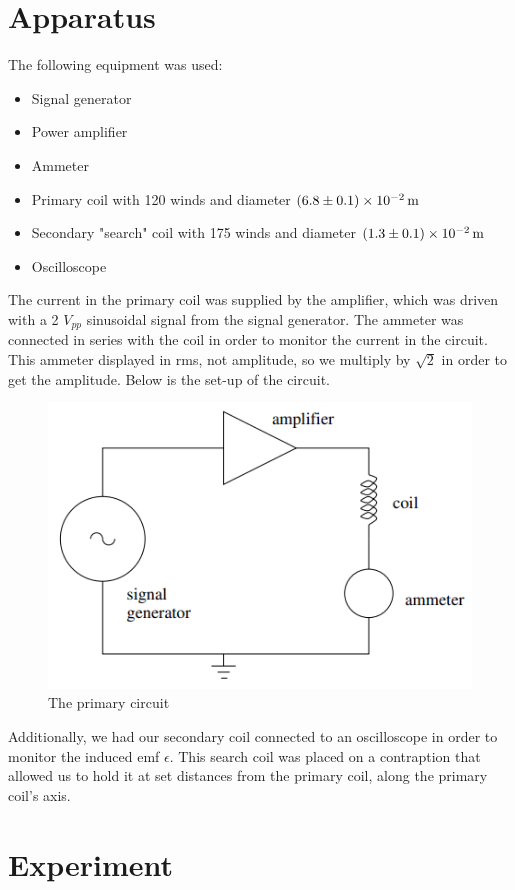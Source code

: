\documentclass[12pt]{article}
\numberwithin{equation}{section}
\numberwithin{figure}{section}
\numberwithin{table}{section}
\begin{document}
    \section{Apparatus}
    The following equipment was used:
    \begin{itemize}
        \item Signal generator
        \item Power amplifier
        \item Ammeter
        \item Primary coil with 120 winds and diameter $\SI{6.8\pm0.1e-2}{\metre}$
        \item Secondary "search" coil with 175 winds and diameter $\SI{1.3\pm0.1e-2}{\metre}$
        \item Oscilloscope
    \end{itemize}
    The current in the primary coil was supplied by the amplifier, which was driven with a
    2 $V_{pp}$ sinusoidal signal from the signal generator. The ammeter was connected in 
    series with the coil in order to monitor the current in the circuit. This ammeter 
    displayed in rms, not amplitude, so we multiply by $\sqrt 2$ in order to get the 
    amplitude. Below is the set-up of the circuit.
    \begin{figure}[H]
        \begin{center}
           \includegraphics[width=.65\textwidth]{PrimaryCircuit.png}
           \caption{The primary circuit}
           \label{fig:PrimaryCircuitDiagram}
        \end{center}
    \end{figure}
    Additionally, we had our secondary coil connected to an oscilloscope in order to monitor 
    the induced emf $\epsilon$. This search coil was placed on a contraption that allowed us 
    to hold it at set distances from the primary coil, along the primary coil's axis. 

    \section{Experiment}
\end{document}
